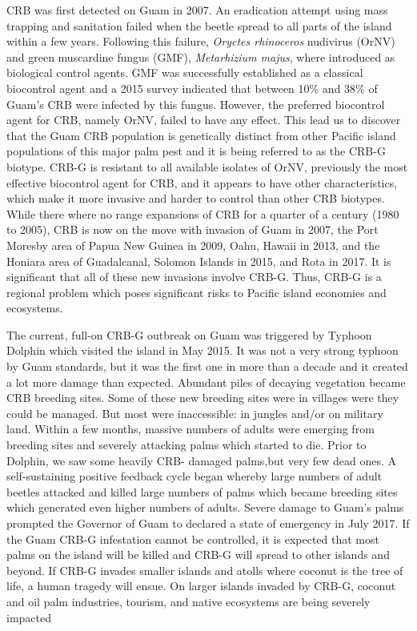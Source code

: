 \documentclass[14pt,english,letterpaper]{scrartcl}
\begin{document}
CRB was first detected on Guam in 2007. An eradication attempt using mass
trapping and sanitation failed when the beetle spread to all parts of the island within a few years. Following this failure, \textit{Oryctes
rhinoceros} nudivirus (OrNV) and green muscardine fungus (GMF), \textit{Metarhizium majus}, where
introduced as biological control agents. GMF was successfully established as a classical biocontrol agent and a 2015 survey
indicated that between 10\% and 38\% of Guam’s CRB were infected by this fungus. However, the
preferred biocontrol agent for CRB, namely OrNV, failed to have any effect. This lead us to
discover that the Guam CRB population is genetically distinct from other Pacific island populations of this major palm pest and it is being
referred to as the CRB-G biotype. CRB-G is resistant to all available isolates of OrNV, previously
the most effective biocontrol agent for CRB, and it appears to have other characteristics, which
make it more invasive and harder to control than other CRB biotypes. While there where no
range expansions of CRB for a quarter of a century (1980 to 2005), CRB is now on the move with
invasion of Guam in 2007, the Port Moresby area of Papua New Guinea in 2009, Oahu,
Hawaii in 2013, and the Honiara area of Guadalcanal, Solomon Islands in 2015, and Rota in
2017. It is significant that all of these new invasions involve CRB-G. Thus, CRB-G is a regional
problem which poses significant risks to Pacific island economies and ecosystems.

The current, full-on CRB-G outbreak on Guam was triggered by Typhoon Dolphin which visited
the island in May 2015. It was not a very strong typhoon by Guam standards, but it was the first
one in more than a decade and it created a lot more damage than expected. Abundant piles of
decaying vegetation became CRB breeding sites. Some of these new breeding sites were in
villages were they could be managed. But most were inaccessible: in jungles and/or on military
land. Within a few months, massive numbers of adults were emerging from breeding sites and
severely attacking palms which started to die. Prior to Dolphin, we saw some heavily CRB-
damaged palms,but very few dead ones. A self-sustaining positive feedback cycle began
whereby large numbers of adult beetles attacked and killed large numbers of palms which
became breeding sites which generated even higher numbers of adults. Severe damage to
Guam’s palms prompted the Governor of Guam to declared a state of emergency in July 2017. If
the Guam CRB-G infestation cannot be controlled, it is expected that most palms on the island
will be killed and CRB-G will spread to other islands and beyond. If CRB-G invades smaller
islands and atolls where coconut is the tree of life, a human tragedy will ensue. On larger
islands invaded by CRB-G, coconut and oil palm industries, tourism, and native ecosystems are being severely
impacted
\end{document}
